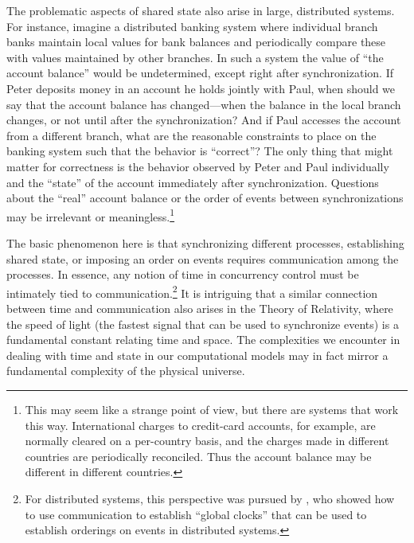 The problematic aspects of shared state also arise in large, distributed
systems.  For instance, imagine a distributed banking system where individual
branch banks maintain local values for bank balances and periodically compare
these with values maintained by other branches.  In such a system the value of
``the account balance'' would be undetermined, except right after
synchronization.  If Peter deposits money in an account he holds jointly with
Paul, when should we say that the account balance has changed---when the
balance in the local branch changes, or not until after the synchronization?
And if Paul accesses the account from a different branch, what are the
reasonable constraints to place on the banking system such that the behavior is
``correct''?  The only thing that might matter for correctness is the behavior
observed by Peter and Paul individually and the ``state'' of the account
immediately after synchronization.  Questions about the ``real'' account
balance or the order of events between synchronizations may be irrelevant or
meaningless.\footnote{This may seem like a strange point of view, but there are
systems that work this way.  International charges to credit-card accounts, for
example, are normally cleared on a per-country basis, and the charges made in
different countries are periodically reconciled.  Thus the account balance may
be different in different countries.}

The basic phenomenon here is that synchronizing different processes,
establishing shared state, or imposing an order on events requires
communication among the processes.  In essence, any notion of time in
concurrency control must be intimately tied to communication.\footnote{For
distributed systems, this perspective was pursued by , who showed
how to use communication to establish ``global clocks'' that can be used to
establish orderings on events in distributed systems.}  It is intriguing that a
similar connection between time and communication also arises in the Theory of
Relativity, where the speed of light (the fastest signal that can be used to
synchronize events) is a fundamental constant relating time and space.  The
complexities we encounter in dealing with time and state in our computational
models may in fact mirror a fundamental complexity of the physical universe.
